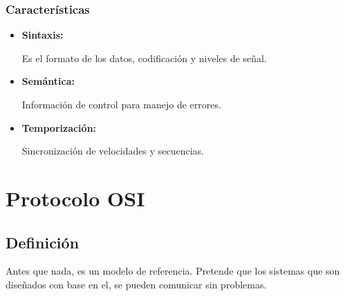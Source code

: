 \documentclass[12pt, fleqn]{report}                             %
\theoremstyle{break}                                            %
\begin{document}
            \subsection{Características}

                \begin{itemize}
                    
                    \item \textbf{Sintaxis:}

                        Es el formato de los datos, codificación y niveles de señal.

                    \item \textbf{Semántica:}

                        Información de control para manejo de errores.

                    \item \textbf{Temporización:}

                        Sincronización de velocidades y secuencias.

                \end{itemize}



    \chapter{Protocolo OSI}


        \clearpage
        \section{Definición}

            Antes que nada, es un modelo de referencia. Pretende que los sistemas que son diseñados
            con base en el, se pueden comunicar sin problemas.
\end{document}
